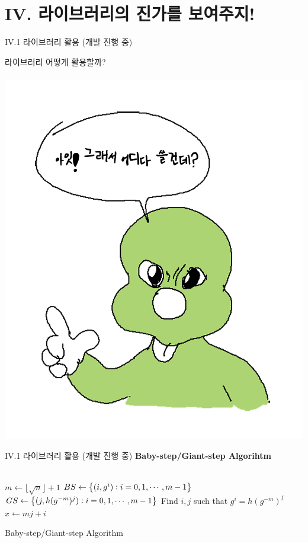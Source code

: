 \documentclass{beamer}
\begin{document}
\section{IV. 라이브러리의 진가를 보여주지!}

\begin{frame}{IV.1 라이브러리 활용 (개발 진행 중)}
	\begin{center}
		라이브러리 어떻게 활용할까?\\
		\ \\
		\includegraphics[scale=.3]{lib5.png}
	\end{center}
\end{frame}

\begin{frame}{IV.1 라이브러리 활용 (개발 진행 중)}
	\alert{\bf Baby-step/Giant-step Algorihtm}\\
	\ \\
	\begin{algorithm}[H]
		$m \leftarrow \lfloor\sqrt{n}\rfloor+1$ 
		$BS\gets\set{(i,g^i):i=0,1,\cdots, m-1}$ 
		$GS\gets\set{(j, h(g^{-m})^j):i=0,1,\cdots, m-1}$ 
		Find $i,j$ such that $g^{i}=h({g^{-m}})^j$\;
		\Return $x\gets mj+i$\;
		\caption{Baby-step/Giant-step Algorithm}
	\end{algorithm}
\end{frame}
\end{document}
